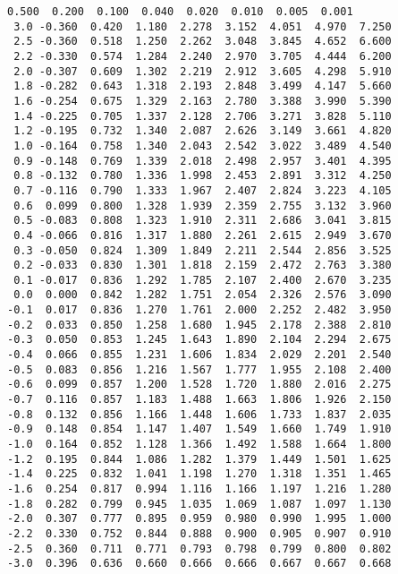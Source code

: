 \documentclass[11pt]{article}
\makeatletter
\newcommand{\boxspacing}{\kern\kvtcb@left@rule\kern\kvtcb@boxsep}
\newcommand{\prompt}[4]{
        {\ttfamily\llap{{\color{#2}[#3]:\hspace{3pt}#4}}\vspace{-\baselineskip}}
    }
\makeatother
\begin{document}
            \begin{tcolorbox}[breakable, size=fbox, boxrule=.5pt, pad at break*=1mm, opacityfill=0]
\prompt{Out}{outcolor}{ }{\boxspacing}
\begin{Verbatim}[commandchars=\\\{\}]
      0.500  0.200  0.100  0.040  0.020  0.010  0.005  0.001
 3.0 -0.360  0.420  1.180  2.278  3.152  4.051  4.970  7.250
 2.5 -0.360  0.518  1.250  2.262  3.048  3.845  4.652  6.600
 2.2 -0.330  0.574  1.284  2.240  2.970  3.705  4.444  6.200
 2.0 -0.307  0.609  1.302  2.219  2.912  3.605  4.298  5.910
 1.8 -0.282  0.643  1.318  2.193  2.848  3.499  4.147  5.660
 1.6 -0.254  0.675  1.329  2.163  2.780  3.388  3.990  5.390
 1.4 -0.225  0.705  1.337  2.128  2.706  3.271  3.828  5.110
 1.2 -0.195  0.732  1.340  2.087  2.626  3.149  3.661  4.820
 1.0 -0.164  0.758  1.340  2.043  2.542  3.022  3.489  4.540
 0.9 -0.148  0.769  1.339  2.018  2.498  2.957  3.401  4.395
 0.8 -0.132  0.780  1.336  1.998  2.453  2.891  3.312  4.250
 0.7 -0.116  0.790  1.333  1.967  2.407  2.824  3.223  4.105
 0.6  0.099  0.800  1.328  1.939  2.359  2.755  3.132  3.960
 0.5 -0.083  0.808  1.323  1.910  2.311  2.686  3.041  3.815
 0.4 -0.066  0.816  1.317  1.880  2.261  2.615  2.949  3.670
 0.3 -0.050  0.824  1.309  1.849  2.211  2.544  2.856  3.525
 0.2 -0.033  0.830  1.301  1.818  2.159  2.472  2.763  3.380
 0.1 -0.017  0.836  1.292  1.785  2.107  2.400  2.670  3.235
 0.0  0.000  0.842  1.282  1.751  2.054  2.326  2.576  3.090
-0.1  0.017  0.836  1.270  1.761  2.000  2.252  2.482  3.950
-0.2  0.033  0.850  1.258  1.680  1.945  2.178  2.388  2.810
-0.3  0.050  0.853  1.245  1.643  1.890  2.104  2.294  2.675
-0.4  0.066  0.855  1.231  1.606  1.834  2.029  2.201  2.540
-0.5  0.083  0.856  1.216  1.567  1.777  1.955  2.108  2.400
-0.6  0.099  0.857  1.200  1.528  1.720  1.880  2.016  2.275
-0.7  0.116  0.857  1.183  1.488  1.663  1.806  1.926  2.150
-0.8  0.132  0.856  1.166  1.448  1.606  1.733  1.837  2.035
-0.9  0.148  0.854  1.147  1.407  1.549  1.660  1.749  1.910
-1.0  0.164  0.852  1.128  1.366  1.492  1.588  1.664  1.800
-1.2  0.195  0.844  1.086  1.282  1.379  1.449  1.501  1.625
-1.4  0.225  0.832  1.041  1.198  1.270  1.318  1.351  1.465
-1.6  0.254  0.817  0.994  1.116  1.166  1.197  1.216  1.280
-1.8  0.282  0.799  0.945  1.035  1.069  1.087  1.097  1.130
-2.0  0.307  0.777  0.895  0.959  0.980  0.990  1.995  1.000
-2.2  0.330  0.752  0.844  0.888  0.900  0.905  0.907  0.910
-2.5  0.360  0.711  0.771  0.793  0.798  0.799  0.800  0.802
-3.0  0.396  0.636  0.660  0.666  0.666  0.667  0.667  0.668
\end{Verbatim}
\end{tcolorbox}
        
\end{document}
